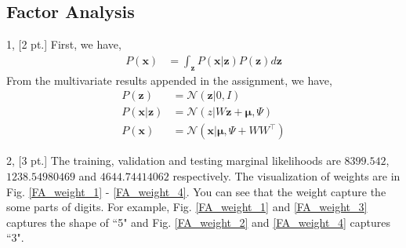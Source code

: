 \documentclass[12pt,letterpaper]{article}
\begin{document}
\subsection{Factor Analysis}

1, [2 pt.] 
First, we have,
\begin{align}
P(\mathbf{x}) & = \int_{\mathbf{z}}  P(\mathbf{x} | \mathbf{z}) P(\mathbf{z}) d\mathbf{z}
\end{align}
From the multivariate results appended in the assignment, we have,
\begin{align}
P(\mathbf{z}) & = \mathcal{N}(\mathbf{z} | 0, I) \nonumber \\
P(\mathbf{x} | \mathbf{z}) & = \mathcal{N}(z | W \mathbf{z} + \bm{\mu}, \Psi) \nonumber \\
P(\mathbf{x}) & = \mathcal{N}(\mathbf{x} | \bm{\mu}, \Psi + W W^{\top} ) 
\end{align}

2, [3 pt.] The training, validation and testing marginal likelihoods are $8399.542$, $1238.54980469$ and $4644.74414062$ respectively. The visualization of weights are in Fig. \ref{FA_weight_1} - \ref{FA_weight_4}. You can see that the weight capture the some parts of digits. For example, Fig. \ref{FA_weight_1} and \ref{FA_weight_3} captures the shape of ``5" and Fig. \ref{FA_weight_2} and \ref{FA_weight_4} captures ``3".
\end{document}
